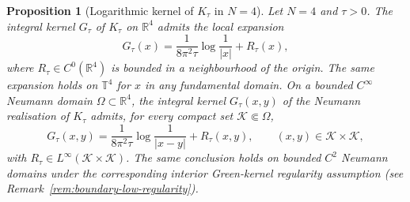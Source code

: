 \documentclass[11pt,reqno]{amsart}
\newtheorem{proposition}[theorem]{Proposition}
\theoremstyle{definition}
\theoremstyle{remark}
\newcommand{\R}{\mathbb{R}}
\newcommand{\T}{\mathbb{T}}
\begin{document}
\begin{proposition}[Logarithmic kernel of $K_\tau$ in $N=4$]\label{prop:log-kernel-R4}
Let $N=4$ and $\tau>0$. The integral kernel $G_\tau$ of $K_\tau$ on $\R^{4}$ admits the local expansion
\begin{equation}\label{eq:Gtau-expansion-R4}
        G_\tau(x)=\frac{1}{8\pi^{2}\tau}\log\frac{1}{|x|}+R_\tau(x),
\end{equation}
where $R_\tau\in C^{0}(\R^{4})$ is bounded in a neighbourhood of the origin. The same expansion holds on $\T^{4}$ for $x$ in any fundamental domain. On a bounded $C^{\infty}$ Neumann domain $\Omega\subset\R^{4}$, the integral kernel $G_\tau(x,y)$ of the Neumann realisation of $K_\tau$ admits, for every compact set $\mathcal K\Subset\Omega$,
\begin{equation}\label{eq:Gtau-expansion-domain}
        G_\tau(x,y)=\frac{1}{8\pi^{2}\tau}\log\frac{1}{|x-y|}+R_\tau(x,y),\qquad (x,y)\in\mathcal K\times\mathcal K,
\end{equation}
with $R_\tau\in L^{\infty}(\mathcal K\times\mathcal K)$. The same conclusion holds on bounded $C^{2}$ Neumann domains under the corresponding interior Green-kernel regularity assumption \emph{(}see Remark~\ref{rem:boundary-low-regularity}\emph{)}.
\end{proposition}
\end{document}
